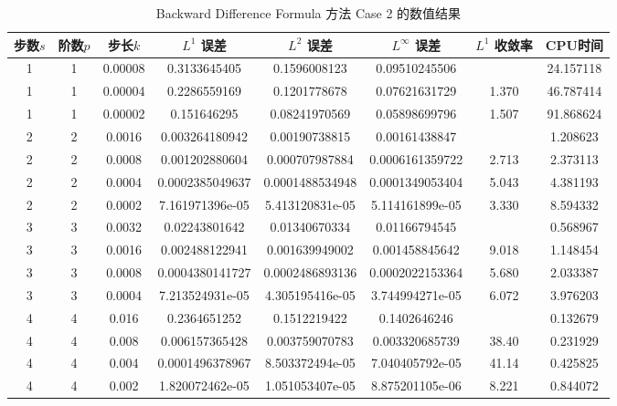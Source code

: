 \documentclass[a4paper]{article}
\begin{document}
\begin{table}
    \centering
    \caption{Backward Difference Formula 方法 Case 2 的数值结果}
    \begin{tabular}{|c|c|c|c|c|c|c|c|}
        \hline
        步数$s$ & 阶数$p$ & 步长$k$ & $L^1$ 误差  & $L^2$ 误差 & $L^\infty$ 误差 & $L^1$ 收敛率 & CPU时间 \\
        \hline
        1 & 1 & 0.00008 & 0.3133645405 & 0.1596008123 & 0.09510245506 & ~ & 24.157118 \\
        1 & 1 & 0.00004 & 0.2286559169 & 0.1201778678 & 0.07621631729 & 1.370 & 46.787414 \\
        1 & 1 & 0.00002 & 0.151646295 & 0.08241970569 & 0.05898699796 & 1.507 & 91.868624 \\
        \hline 
        2 & 2 & 0.0016 & 0.003264180942 & 0.00190738815 &  0.00161438847 & ~ & 1.208623 \\
        2 & 2 & 0.0008 & 0.001202880604 & 0.000707987884 & 0.0006161359722 & 2.713 & 2.373113 \\
        2 & 2 & 0.0004 & 0.0002385049637 & 0.0001488534948 & 0.0001349053404 & 5.043 & 4.381193 \\
        2 & 2 & 0.0002 & 7.161971396e-05 & 5.413120831e-05 & 5.114161899e-05 & 3.330 & 8.594332 \\
        \hline 
        3 & 3 & 0.0032 & 0.02243801642 & 0.01340670334 & 0.01166794545 & ~ & 0.568967 \\
        3 & 3 & 0.0016 & 0.002488122941 & 0.001639949002 & 0.001458845642 & 9.018 & 1.148454 \\
        3 & 3 & 0.0008 & 0.0004380141727 & 0.0002486893136 & 0.0002022153364 & 5.680 & 2.033387 \\
        3 & 3 & 0.0004 & 7.213524931e-05 & 4.305195416e-05 & 3.744994271e-05 & 6.072 & 3.976203 \\
        \hline
        4 & 4 & 0.016 & 0.2364651252 & 0.1512219422 & 0.1402646246 & ~ & 0.132679 \\ 
        4 & 4 & 0.008 & 0.006157365428 & 0.003759070783 & 0.003320685739 & 38.40 & 0.231929 \\
        4 & 4 & 0.004 & 0.0001496378967 & 8.503372494e-05 & 7.040405792e-05 & 41.14 & 0.425825 \\
        4 & 4 & 0.002 & 1.820072462e-05 & 1.051053407e-05 & 8.875201105e-06 & 8.221 & 0.844072 \\
        \hline 
    \end{tabular}
\end{table}
\end{document}
